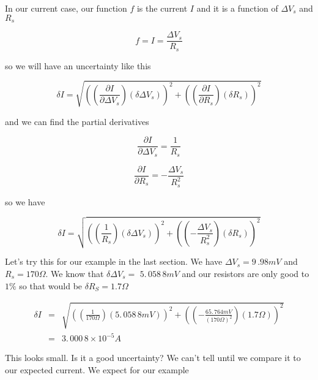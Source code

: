 In our current case, our function $f$ is the current $I$ and it is a function of $\Delta V_{s}$ and $R_{s}$ 

\begin{equation*}
	f=I=\frac{\Delta V_{s}}{R_{s}}
\end{equation*}

\noindent so we will have an uncertainty like this

\begin{equation*}
	\delta I=\sqrt{\left( \left( \frac{\partial I}{\partial \Delta V_{s}}\right) \left( \delta \Delta V_{s}\right) \right) ^{2}+\left( \left( \frac{\partial I}{\partial R_{s}}\right) \left( \delta R_{s}\right) \right) ^{2}}
\end{equation*}

\noindent and we can find the partial derivatives

\begin{equation*}
	\frac{\partial I}{\partial \Delta V_{s}}=\frac{1}{R_{s}}
\end{equation*}

\begin{equation*}
	\frac{\partial I}{\partial R_{s}}=-\frac{\Delta V_{s}}{R_{s}^{2}}
\end{equation*}

\noindent so we have 

\begin{equation*}
	\delta I=\sqrt{\left( \left( \frac{1}{R_{s}}\right) \left( \delta \Delta V_{s}\right) \right) ^{2}+\left( \left( -\frac{\Delta V_{s}}{R_{s}^{2}}\right) \left( \delta R_{s}\right) \right) ^{2}}
\end{equation*}

Let's try this for our example in the last section. We have $\Delta V_{s}=9\,.98\unit{mV}$ and $R_{s}=170\unit{\Omega}.$ We know that $\delta \Delta V_{s}=$ $5.\,\allowbreak 058\,8\unit{mV}$ and our resistors are only good to $1\%$ so that would be $\delta R_{S}=1.7\unit{\Omega}$

\begin{eqnarray*}
	\delta I &=&\sqrt{\left( \left( \frac{1}{170\unit{\Omega}}\right) \left( 5.\,\allowbreak 058\,8\unit{mV}\right) \right) ^{2}+\left(
	\left( -\frac{65.\,\allowbreak 764\unit{mV}}{\left( 170\unit{\Omega}\right) ^{2}}\right) \left( 1.7\unit{\Omega}\right) \right) ^{2}} \\
            &=&3.\,\allowbreak 000\,8\times 10^{-5}\unit{A}
\end{eqnarray*}

This looks small. Is it a good uncertainty? We can't tell until we compare
it to our expected current. We expect for our example 

